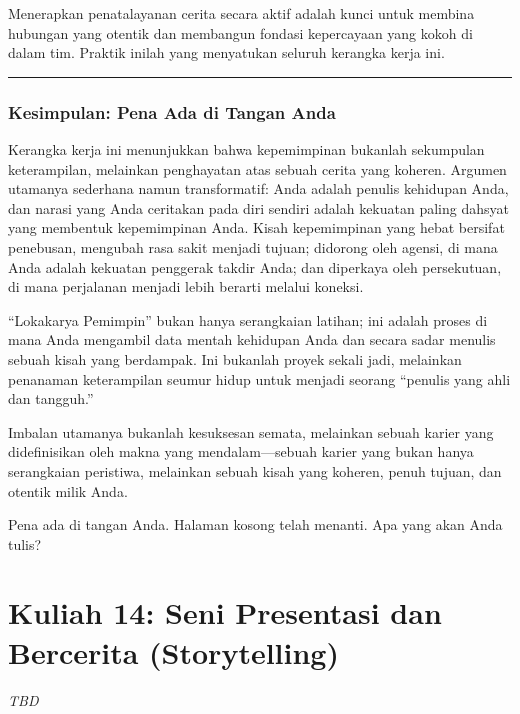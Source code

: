 \documentclass[
  letterpaper,
  DIV=11,
  numbers=noendperiod]{scrreprt}
\begin{document}
Menerapkan penatalayanan cerita secara aktif adalah kunci untuk membina
hubungan yang otentik dan membangun fondasi kepercayaan yang kokoh di
dalam tim. Praktik inilah yang menyatukan seluruh kerangka kerja ini.

\begin{center}\rule{0.5\linewidth}{0.5pt}\end{center}

\subsection{Kesimpulan: Pena Ada di Tangan
Anda}\label{kesimpulan-pena-ada-di-tangan-anda}

Kerangka kerja ini menunjukkan bahwa kepemimpinan bukanlah sekumpulan
keterampilan, melainkan penghayatan atas sebuah cerita yang koheren.
Argumen utamanya sederhana namun transformatif: Anda adalah penulis
kehidupan Anda, dan narasi yang Anda ceritakan pada diri sendiri adalah
kekuatan paling dahsyat yang membentuk kepemimpinan Anda. Kisah
kepemimpinan yang hebat bersifat penebusan, mengubah rasa sakit menjadi
tujuan; didorong oleh agensi, di mana Anda adalah kekuatan penggerak
takdir Anda; dan diperkaya oleh persekutuan, di mana perjalanan menjadi
lebih berarti melalui koneksi.

``Lokakarya Pemimpin'' bukan hanya serangkaian latihan; ini adalah
proses di mana Anda mengambil data mentah kehidupan Anda dan secara
sadar menulis sebuah kisah yang berdampak. Ini bukanlah proyek sekali
jadi, melainkan penanaman keterampilan seumur hidup untuk menjadi
seorang ``penulis yang ahli dan tangguh.''

Imbalan utamanya bukanlah kesuksesan semata, melainkan sebuah karier
yang didefinisikan oleh makna yang mendalam---sebuah karier yang bukan
hanya serangkaian peristiwa, melainkan sebuah kisah yang koheren, penuh
tujuan, dan otentik milik Anda.

Pena ada di tangan Anda. Halaman kosong telah menanti. Apa yang akan
Anda tulis?


\chapter{Kuliah 14: Seni Presentasi dan Bercerita
(Storytelling)}\label{kuliah-14-seni-presentasi-dan-bercerita-storytelling}

\emph{TBD}

\end{document}
